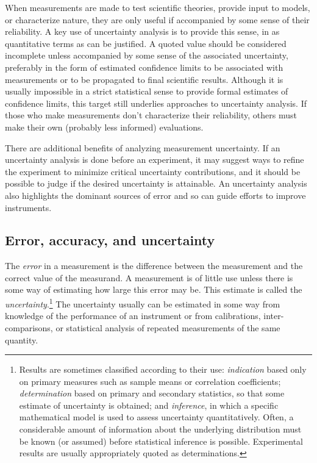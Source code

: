 \documentclass[12pt,twoside,english]{article}\usepackage[]{graphicx}\usepackage[]{color}
\begin{document}
{{When measurements are made to test scientific theories, provide input to models, or characterize nature, they are only useful if accompanied by some sense of their reliability. A key use of uncertainty analysis is to provide this sense, in as quantitative terms as can be justified. A quoted value should be considered incomplete unless accompanied by some sense of the associated uncertainty, preferably in the form of estimated confidence limits to be associated with measurements or to be propagated to final scientific results. Although it is usually impossible in a strict statistical sense to provide formal estimates of confidence limits, this target still underlies approaches to uncertainty analysis. If those who make measurements don't characterize their reliability, others must make their own (probably less informed) evaluations. 

There are additional benefits of analyzing measurement uncertainty. If an uncertainty analysis is done before an experiment, it may suggest ways to refine the experiment to minimize critical uncertainty contributions, and it should be possible to judge if the desired uncertainty is attainable. An uncertainty analysis also highlights the dominant sources of error and so can guide efforts to improve instruments. 


\subsection{Error, accuracy, and uncertainty}

The \emph{error} in a measurement is the difference between the measurement and the correct value of the measurand. A measurement is of little use unless there is some way of estimating how large this error may be. This estimate is called the \emph{uncertainty}.\footnote{Results are sometimes classified according to their use: \textit{indication} based only on primary measures such as sample means or correlation coefficients; \textit{determination} based on primary and secondary statistics, so that some estimate of uncertainty is obtained; and 
\textit{inference}, in which a specific mathematical model is used to assess uncertainty quantitatively. Often, a considerable amount of information about the underlying distribution must be known (or assumed) before statistical inference is possible. Experimental results are usually appropriately quoted as determinations.} The uncertainty usually can be estimated in some way from knowledge of the performance of an instrument or from calibrations, inter-comparisons, or statistical analysis of repeated measurements of the same quantity. 

}}
\end{document}
